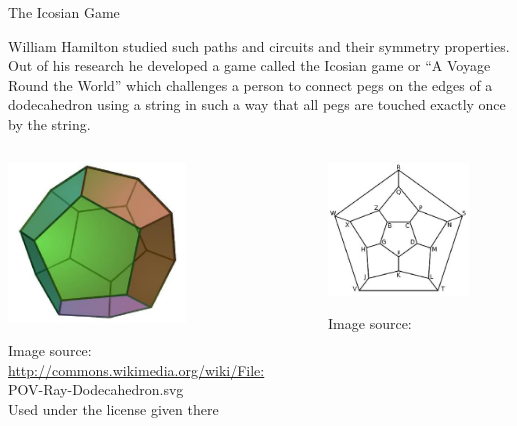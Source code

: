 \documentclass[smaller,hyperref={CJKbookmarks=true}]{beamer}
\begin{document}
\begin{frame}{The Icosian Game}
\begin{spacing}{1.05}
William Hamilton studied such paths and circuits and their symmetry
properties. Out of his research he developed a game called the Icosian
game or ``A Voyage Round the World'' which challenges a person to
connect pegs on the edges of a dodecahedron using a string in such a way that all pegs are touched exactly once by the string.\\[3pt]
\begin{columns}[onlytextwidth]
\begin{column}{0.5\textwidth}
\begin{center}
\begin{spacing}{0.5}
\includegraphics[width=0.7\columnwidth,height=120pt]{pent.jpg}\\
\begin{tiny}
Image source:\\
\url{http://commons.wikimedia.org/wiki/File:}\\
POV-Ray-Dodecahedron.svg\\
Used under the license given there
\end{tiny}
\end{spacing}
\end{center}
\end{column}
\begin{column}{0.5\textwidth}
\begin{center}
\begin{spacing}{0.5}
\includegraphics[width=0.7\columnwidth,height=100pt]{pent2.jpg}\\
\begin{tiny}
Image source:\\

\end{tiny}
\end{spacing}
\end{center}
\end{column}
\end{columns}
\end{spacing}
\end{frame}
\end{document}
